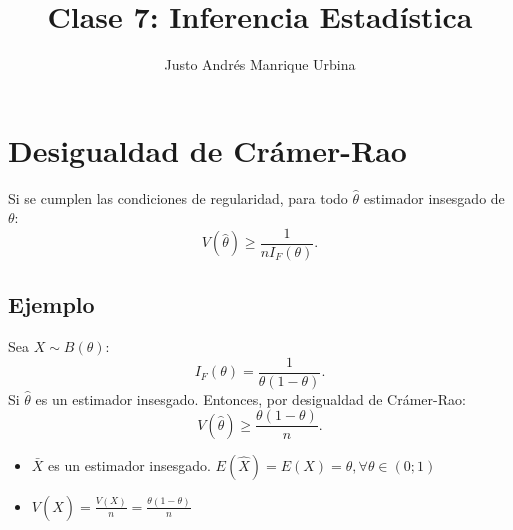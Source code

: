 \documentclass{article}
\title{Clase 7: Inferencia Estadística}
\author{Justo Andrés Manrique Urbina}
\begin{document}
\maketitle

\section{Desigualdad de Crámer-Rao}

Si se cumplen las condiciones de regularidad, para todo $\hat{\theta}$ estimador insesgado de $\theta$:
\[ V{(\hat{\theta})} \geq \frac{1}{n I_{F}{(\theta)}}.\]

\subsection{Ejemplo}

Sea $X \sim B{(\theta)}$:
\[ I_{F}{(\theta)}=\frac{1}{\theta{(1-\theta)}}.\]
Si $\hat{\theta}$ es un estimador insesgado. Entonces, por desigualdad de Crámer-Rao:
\[ V{(\hat{\theta})} \geq \frac{\theta{(1-\theta)}}{n}.\]

\begin{itemize}
	\item $\bar{X}$ es un estimador insesgado. $E{(\hat{X})}=E{(X)}=\theta, \forall \theta \in {(0;1)}$
	\item $V{(\hat{X})}=\frac{V{(X)}}{n}=\frac{\theta{(1-\theta)}}{n}$
\end{itemize}
\end{document}
